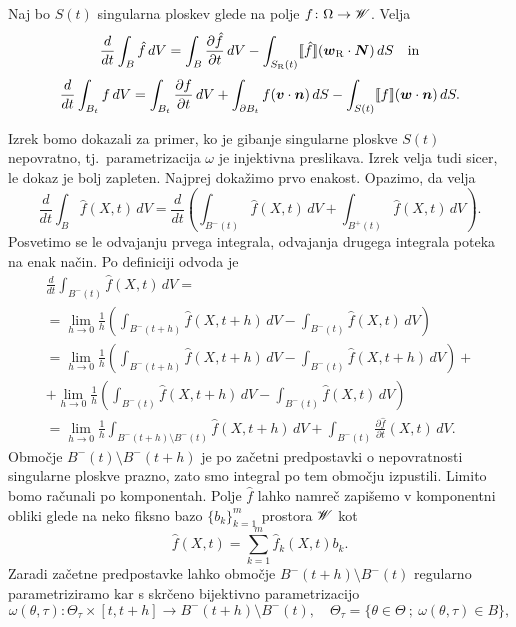 \begin{izrek}
	Naj bo $S(t)$ singularna ploskev glede na polje $f\colon\Omega\to\mathscr W$. Velja
	\begin{equation*}
		\frac{d}{dt}\int_B \hat{f}\,dV = \int_B \frac{\partial \hat{f}}{\partial t}\,dV -
		\int_{S_{\mathrm R}(t)} \llbracket\hat{f}\rrbracket(\boldsymbol w_{\mathrm R}\cdot\boldsymbol N)\,dS\quad\textrm{in}
	\end{equation*}
	\[
		\frac{d}{dt}\int_{B_t} f\,dV = \int_{B_t} \frac{\partial f}{\partial t}\,dV +
		\int_{\partial B_t} f(\boldsymbol v\cdot\boldsymbol n)\,dS - \int_{S(t)} \llbracket f\rrbracket(\boldsymbol w\cdot\boldsymbol n)\,dS.
	\]
\end{izrek}
\proof
	Izrek bomo dokazali za primer, ko je gibanje singularne ploskve $S(t)$ nepovratno, tj.~parametrizacija
	$\omega$ je injektivna preslikava. Izrek velja tudi sicer, le dokaz je bolj zapleten.
	Najprej dokažimo prvo enakost. Opazimo, da velja
	\[
		\frac{d}{dt}\int_B \hat{f}(X,t)\,dV = \frac{d}{dt}\left(
		\int_{B^-(t)} \hat{f}(X,t)\,dV + \int_{B^+(t)} \hat{f}(X,t)\,dV \right).
	\]
	Posvetimo se le odvajanju prvega integrala, odvajanja drugega integrala poteka na enak način.
	Po definiciji odvoda je
	\begin{gather*}
		\frac{d}{dt}\int_{B^-(t)} \hat{f}(X,t)\,dV =\\ =\lim_{h\to 0} \frac{1}{h}\left(
		\int_{B^-(t+h)} \hat{f}(X,t+h)\,dV - \int_{B^-(t)} \hat{f}(X,t)\,dV \right) \\
		=\lim_{h\to 0} \frac{1}{h}\left( \int_{B^-(t+h)} \hat{f}(X,t+h)\,dV - \int_{B^-(t)} \hat{f}(X,t+h)\,dV \right) + \\
		+ \lim_{h\to 0} \frac{1}{h}\left( \int_{B^-(t)} \hat{f}(X,t+h)\,dV - \int_{B^-(t)} \hat{f}(X,t)\,dV \right) \\
		= \lim_{h\to 0} \frac{1}{h}\int_{B^-(t+h)\setminus B^-(t)} \hat{f}(X,t+h)\,dV +
		\int_{B^-(t)} \frac{\partial\hat{f}}{\partial t}(X,t)\,dV.
	\end{gather*}
	Območje $B^-(t)\setminus B^-(t+h)$ je po začetni predpostavki o nepovratnosti singularne ploskve prazno,
	zato smo integral po tem območju izpustili. Limito bomo računali po komponentah. Polje $\hat{f}$
	lahko namreč zapišemo v komponentni obliki glede na neko fiksno bazo $\{b_k\}_{k=1}^m$ prostora $\mathscr W$ kot
	\[ \hat{f}(X,t)=\sum_{k=1}^m \hat{f}_k(X,t)b_k. \]
	Zaradi začetne predpostavke lahko
	območje $B^-(t+h)\setminus B^-(t)$ regularno parametriziramo kar s skrčeno bijektivno parametrizacijo
	\[
		\omega(\theta,\tau)\colon\Theta_{\tau}\times [t,t+h]\to B^-(t+h)\setminus B^-(t),\quad
		\Theta_{\tau}=\{\theta\in \Theta\: ;\: \omega(\theta,\tau)\in B\},
	\]
